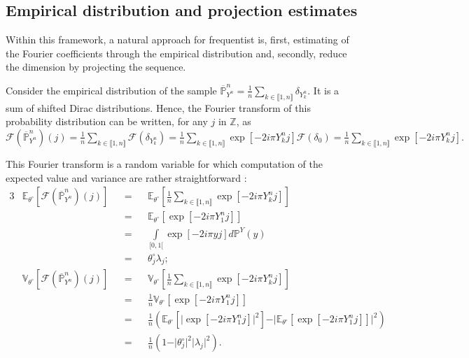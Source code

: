 \subsection{Empirical distribution and projection estimates}\label{INTRO_CIRCULARDECONVOLUTION_PROJESTIM}
Within this framework, a natural approach for frequentist is, first, estimating of the Fourier coefficients through the empirical distribution and, secondly, reduce the dimension by projecting the sequence.

Consider the empirical distribution of the sample $\overline{\mathds{P}}_{Y^{n}}^{n} = \frac{1}{n}\sum\limits_{k \in \llbracket 1, n \rrbracket} \delta_{Y^{n}_{k}}.$
It is a sum of shifted Dirac distributions.
Hence, the Fourier transform of this probability distribution can be written, for any $j$ in $\mathds{Z}$, as $\mathcal{F}(\overline{\mathds{P}}_{Y^{n}}^{n})(j) = \frac{1}{n}\sum\limits_{k \in \llbracket 1, n \rrbracket} \mathcal{F}(\delta_{Y_{k}^{n}}) = \frac{1}{n}\sum\limits_{k \in \llbracket 1, n \rrbracket} \exp[- 2 i \pi Y_{k}^{n} j] \mathcal{F}(\delta_{0}) = \frac{1}{n}\sum\limits_{k \in \llbracket 1, n \rrbracket} \exp[- 2 i \pi Y_{k}^{n} j].$

\medskip

This Fourier transform is a random variable for which computation of the expected value and variance are rather straightforward :
\begin{alignat*}{3}
&\mathds{E}_{\theta^{\circ}}[\mathcal{F}(\overline{\mathds{P}}_{Y^{n}}^{n})(j)] &&=&& \mathds{E}_{\theta^{\circ}}\left[\frac{1}{n}\sum\limits_{k \in \llbracket 1, n \rrbracket} \exp[- 2 i \pi Y_{k}^{n} j]\right]\\
& &&=&&\mathds{E}_{\theta^{\circ}}\left[ \exp[- 2 i \pi Y_{1}^{n} j]\right]\\
& &&=&&\int\limits_{[0, 1[} \exp[- 2 i \pi y j]d\mathds{P}^{Y}(y)\\
& &&=&&\theta^{\circ}_{j} \lambda_{j};\\
&\mathds{V}_{\theta^{\circ}}[\mathcal{F}(\overline{\mathds{P}}_{Y^{n}}^{n})(j)] &&=&& \mathds{V}_{\theta^{\circ}}\left[\frac{1}{n}\sum\limits_{k \in \llbracket 1, n \rrbracket} \exp[- 2 i \pi Y_{k}^{n} j]\right]\\
& &&=&&\frac{1}{n}\mathds{V}_{\theta^{\circ}}\left[ \exp[- 2 i \pi Y_{1}^{n} j]\right]\\
& &&=&&\frac{1}{n}\left(\mathds{E}_{\theta^{\circ}}\left[\vert\exp[- 2 i \pi Y_{1}^{n} j]\vert^{2}\right] - \vert \mathds{E}_{\theta^{\circ}}\left[ \exp\left[- 2 i \pi Y_{1}^{n} j\right]\right] \vert^{2}\right)\\
& &&=&&\frac{1}{n}\left(1 - \vert\theta^{\circ}_{j}\vert^{2}\vert\lambda_{j}\vert^{2}\right).
\end{alignat*}

